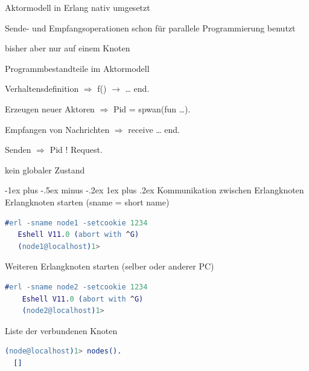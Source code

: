 \documentclass[10pt]{article}
\makeatletter
\renewcommand{\subsubsection}{\@startsection{subsubsection}{3}{0mm}%
                                {-1ex plus -.5ex minus -.2ex}%
                                {1ex plus .2ex}%
                                {\normalfont\small\bfseries}}
\makeatother
\begin{document}
  \begin{itemize*}
    \item Aktormodell in Erlang nativ umgesetzt
    \begin{itemize*}
      \item Sende- und Empfangsoperationen schon für parallele Programmierung benutzt
      \item bisher aber nur auf einem Knoten
    \end{itemize*}
    \item Programmbestandteile im Aktormodell
    \begin{itemize*}
      \item Verhaltensdefinition $\Rightarrow$ f() $\rightarrow$ … end.
      \item Erzeugen neuer Aktoren $\Rightarrow$ Pid = spwan(fun …).
      \item Empfangen von Nachrichten $\Rightarrow$ receive … end.
      \item Senden $\Rightarrow$ Pid ! Request.
    \end{itemize*}
    \item kein globaler Zustand
  \end{itemize*}
  
  \subsubsection{Kommunikation zwischen Erlangknoten}
  Erlangknoten starten (sname = short name)
  \begin{lstlisting}[language=erlang]
  #erl -sname node1 -setcookie 1234
   Eshell V11.0 (abort with ^G)
   (node1@localhost)1>
\end{lstlisting}
  
  Weiteren Erlangknoten starten (selber oder anderer PC)
  \begin{lstlisting}[language=erlang]
  #erl -sname node2 -setcookie 1234
    Eshell V11.0 (abort with ^G)
    (node2@localhost)1>
\end{lstlisting}
  
  Liste der verbundenen Knoten
  \begin{lstlisting}[language=erlang]
  (node@localhost)1> nodes().
  []
\end{lstlisting}
  
\end{document}
